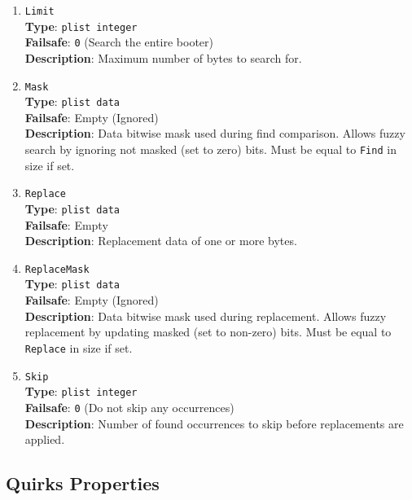 \documentclass[]{article}
\begin{document}
\begin{enumerate}
\item
  \texttt{Limit}\\
  \textbf{Type}: \texttt{plist\ integer}\\
  \textbf{Failsafe}: \texttt{0} (Search the entire booter)\\
  \textbf{Description}: Maximum number of bytes to search for.

\item
  \texttt{Mask}\\
  \textbf{Type}: \texttt{plist\ data}\\
  \textbf{Failsafe}: Empty (Ignored)\\
  \textbf{Description}: Data bitwise mask used during find comparison.
  Allows fuzzy search by ignoring not masked (set to zero) bits.
  Must be equal to \texttt{Find} in size if set.

\item
  \texttt{Replace}\\
  \textbf{Type}: \texttt{plist\ data}\\
  \textbf{Failsafe}: Empty\\
  \textbf{Description}: Replacement data of one or more bytes.

\item
  \texttt{ReplaceMask}\\
  \textbf{Type}: \texttt{plist\ data}\\
  \textbf{Failsafe}: Empty (Ignored)\\
  \textbf{Description}: Data bitwise mask used during replacement.
  Allows fuzzy replacement by updating masked (set to non-zero) bits.
  Must be equal to \texttt{Replace} in size if set.

\item
  \texttt{Skip}\\
  \textbf{Type}: \texttt{plist\ integer}\\
  \textbf{Failsafe}: \texttt{0} (Do not skip any occurrences)\\
  \textbf{Description}: Number of found occurrences to skip before
  replacements are applied.

\end{enumerate}

\subsection{Quirks Properties}\label{booterpropsquirks}
\end{document}
